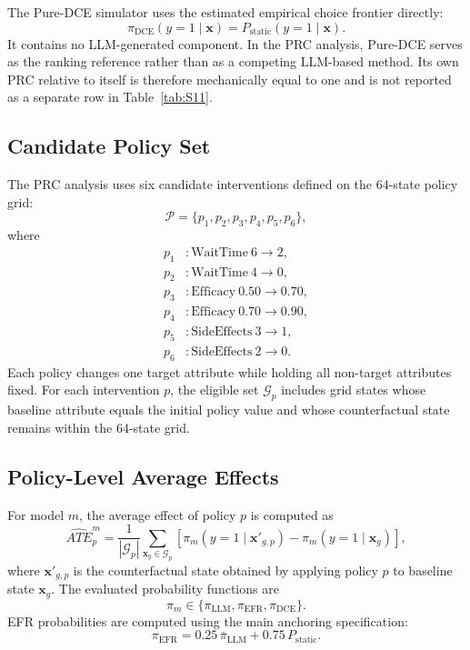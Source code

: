 \documentclass[11pt]{article}
\begin{document}
The Pure-DCE simulator uses the estimated empirical choice frontier directly:
\[
\pi_{\mathrm{DCE}}(y=1\mid \mathbf{x})
=
P_{\mathrm{static}}(y=1\mid \mathbf{x}).
\]
It contains no LLM-generated component. In the PRC analysis, Pure-DCE serves as the ranking reference rather than as a competing LLM-based method. Its own PRC relative to itself is therefore mechanically equal to one and is not reported as a separate row in Table~\ref{tab:S11}.

\subsection{Candidate Policy Set}

The PRC analysis uses six candidate interventions defined on the 64-state policy grid:
\[
\mathcal{P}
=
\{p_1,p_2,p_3,p_4,p_5,p_6\},
\]
where
\[
\begin{aligned}
p_1 &: \mathrm{WaitTime}\ 6 \rightarrow 2,\\
p_2 &: \mathrm{WaitTime}\ 4 \rightarrow 0,\\
p_3 &: \mathrm{Efficacy}\ 0.50 \rightarrow 0.70,\\
p_4 &: \mathrm{Efficacy}\ 0.70 \rightarrow 0.90,\\
p_5 &: \mathrm{SideEffects}\ 3 \rightarrow 1,\\
p_6 &: \mathrm{SideEffects}\ 2 \rightarrow 0.
\end{aligned}
\]
Each policy changes one target attribute while holding all non-target attributes fixed. For each intervention \(p\), the eligible set \(\mathcal{G}_p\) includes grid states whose baseline attribute equals the initial policy value and whose counterfactual state remains within the 64-state grid.

\subsection{Policy-Level Average Effects}

For model \(m\), the average effect of policy \(p\) is computed as
\[
\widehat{ATE}_{p}^{m}
=
\frac{1}{|\mathcal{G}_p|}
\sum_{\mathbf{x}_g \in \mathcal{G}_p}
\left[
\pi_{m}(y=1\mid \mathbf{x}'_{g,p})
-
\pi_{m}(y=1\mid \mathbf{x}_g)
\right],
\]
where \(\mathbf{x}'_{g,p}\) is the counterfactual state obtained by applying policy \(p\) to baseline state \(\mathbf{x}_g\). The evaluated probability functions are
\[
\pi_m
\in
\{
\pi_{\mathrm{LLM}},
\pi_{\mathrm{EFR}},
\pi_{\mathrm{DCE}}
\}.
\]
EFR probabilities are computed using the main anchoring specification:
\[
\pi_{\mathrm{EFR}}
=
0.25\,\bar{\pi}_{\mathrm{LLM}}
+
0.75\,P_{\mathrm{static}}.
\]
\end{document}
